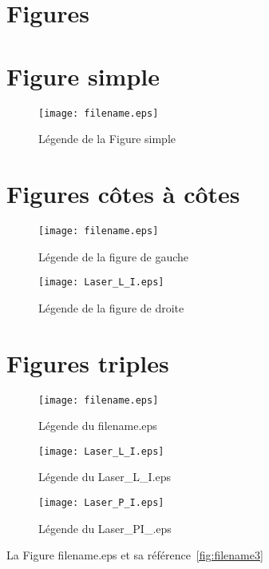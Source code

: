 \documentclass[a4paper, 12pt]{article}
\begin{document}

\tableofcontents
\newpage
\listoffigures
\listoftables
\newpage
\section{Figures}
\section{Figure simple}
\begin{figure}[H]
    \centering
    \texttt{[image: filename.eps]} 
    \caption{Légende de la Figure simple}\label{fig:filename1}
\end{figure}
\section{Figures côtes à côtes}
\begin{figure}[H]
    \begin{minipage}{0.49\textwidth} %
        \centering
        \texttt{[image: filename.eps]} 
        \caption{Légende de la figure de gauche}\label{fig:filename2}
    \end{minipage}
    \hfill
    \begin{minipage}{0.49\textwidth} %
        \centering
        \texttt{[image: Laser\_L\_I.eps]}
        \caption{Légende de la figure de droite}\label{fig:Laser_L_I1}
    \end{minipage}
\end{figure}
\section{Figures triples} 
\begin{figure}[H]
    \begin{minipage}{0.49\textwidth} %
        \centering
        \texttt{[image: filename.eps]} 
        \caption{Légende du filename.eps}\label{fig:filename3}
    \end{minipage}
    \hfill
    \begin{minipage}{0.49\textwidth} %
        \centering
        \texttt{[image: Laser\_L\_I.eps]}
        \caption{Légende du Laser\_L\_I.eps}\label{fig:Laser_L_I2}
    \end{minipage}
    \centering
    \texttt{[image: Laser\_P\_I.eps]}
    \caption{Légende du Laser\_PI\_.eps}\label{fig:Laser_P_I}
\end{figure}
La Figure filename.eps et sa référence~\ref{fig:filename3}
\newpage
\end{document}
